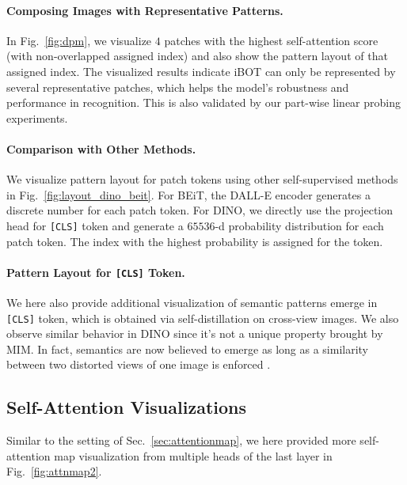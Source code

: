 \documentclass{article} %
\def\ourmethod{{iBOT}\xspace}
\begin{document}
\paragraph{Composing Images with Representative Patterns.} 
In Fig.~\ref{fig:dpm}, we visualize $4$ patches with the highest self-attention score (with non-overlapped assigned index) and also show the pattern layout of that assigned index. 
The visualized results indicate \ourmethod can only be represented by several representative patches, which helps the model's robustness and performance in recognition. This is also validated by our part-wise linear probing experiments.


\paragraph{Comparison with Other Methods.} We visualize pattern layout for patch tokens using other self-supervised methods \citep{beit,dino} in Fig.~\ref{fig:layout_dino_beit}. For BEiT, the DALL-E encoder generates a discrete number for each patch token. For DINO, we directly use the projection head for \texttt{[CLS]} token and generate a $65536$-d probability distribution for each patch token. The index with the highest probability is assigned for the token.


\paragraph{Pattern Layout for \texttt{[CLS]} Token.} We here also provide additional visualization of semantic patterns emerge in \texttt{[CLS]} token, which is obtained via self-distillation on cross-view images. We also observe similar behavior in DINO since it's not a unique property brought by MIM. In fact, semantics are now believed to emerge as long as a similarity between two distorted views of one image is enforced \citep{byol,moco,swav,deepcluster}.

\subsection{Self-Attention Visualizations}
\label{sec:attentionmap2}

Similar to the setting of Sec.~\ref{sec:attentionmap}, we here provided more self-attention map visualization from multiple heads of the last layer in Fig.~\ref{fig:attnmap2}. 
\end{document}
